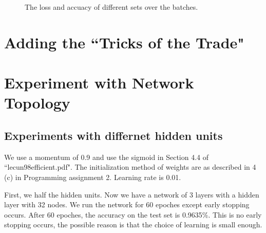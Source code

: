 \documentclass{article} %
\begin{document}
\begin{figure} [!htbp]
	
	\caption{The loss and accuacy of different sets over the batches. }  
	
\end{figure}

\section{Adding the “Tricks of the Trade"}


\section{Experiment with Network Topology}

\subsection{Experiments with differnet hidden units}
We use a momentum of 0.9 and use the sigmoid in Section 4.4 of ``lecun98efficient.pdf". The initialization method of weights are as described in 4 (c) in Programming assignment 2. Learning rate is 0.01.

First, we half the hidden units. Now we have a network of 3 layers with a hidden layer with 32 nodes. We run the network for 60 epoches except early stopping occurs. After 60 epoches, the accuracy on the test set is 0.9635\%. This is no early stopping occurs, the possible reason is that the choice of learning is small enough.
\end{document}
